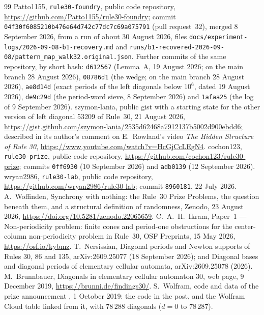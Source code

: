 \documentclass[11pt]{article}
\theoremstyle{definition}
\theoremstyle{remark}
\begin{document}
\begin{thebibliography}{99}
 Patto1155, \texttt{rule30-foundry}, public code repository, \url{https://github.com/Patto1155/rule30-foundry}; commit \texttt{04f30f6085210b476e64}\allowbreak\texttt{d742c77dc7c69a075791} (pull request~32), merged 8 September 2026, from a run of about 30 August 2026, files \texttt{docs/experiment-logs/2026-09-08-b1-recovery.md} and \texttt{runs/b1-recovered-2026-09-08/}\allowbreak\texttt{pattern\_map\_walk32.original.json}. Further commits of the same repository, by short hash: \texttt{d612567} (Lemma~A, 19 August 2026; on the main branch 28 August 2026), \texttt{08786d1} (the wedge; on the main branch 28 August 2026), \texttt{ae8d14d} (exact periods of the left diagonals below $10^{6}$, dated 19 August 2026), \texttt{de9c29d} (the period-word sieve, 8 September 2026) and \texttt{1afaa25} (the log of 9 September 2026).
 szymon-lania, public gist with a starting state for the other version of left diagonal 53209 of Rule~30, 21 August 2026, \url{https://gist.github.com/szymon-lania/2535d62468a7912137b5002d900ebdd6}; described in its author's comment on E.~Rowland's video \emph{The Hidden Structure of Rule 30}, \url{https://www.youtube.com/watch?v=HcGjCcLEgN4}.
 cochon123, \texttt{rule30-prize}, public code repository, \url{https://github.com/cochon123/rule30-prize}; commits \texttt{0ff6930} (10 September 2026) and \texttt{adb0139} (12 September 2026).
 wryan2986, \texttt{rule30-lab}, public code repository, \url{https://github.com/wryan2986/rule30-lab}; commit \texttt{8960181}, 22 July 2026.
 A.~Woffinden, Synchrony with nothing: the Rule~30 Prize Problems, the question beneath them, and a structural definition of randomness, Zenodo, 23 August 2026, \url{https://doi.org/10.5281/zenodo.22065659}.
 C.~A.~H.~Ikram, Paper~1 --- Non-periodicity problem: finite cones and period-one obstructions for the center-column non-periodicity problem in Rule~30, OSF Preprints, 15 May 2026, \url{https://osf.io/kybmz}.
 T.~Nersissian, Diagonal periods and Newton supports of Rules 30, 86 and 135, arXiv:2609.25077 (18 September 2026); and Diagonal bases and diagonal periods of elementary cellular automata, arXiv:2609.25078 (2026).
 M.~Brunnbauer, Diagonals in elementary cellular automaton 30, web page, 9 December 2019, \url{https://brunni.de/findings30/}.
 S.~Wolfram, code and data of the prize announcement \cite{Wolfram}, 1 October 2019: the code in the post, and the Wolfram Cloud table linked from it, with $78\,288$ diagonals ($d=0$ to $78\,287$).

\end{thebibliography}
\end{document}
